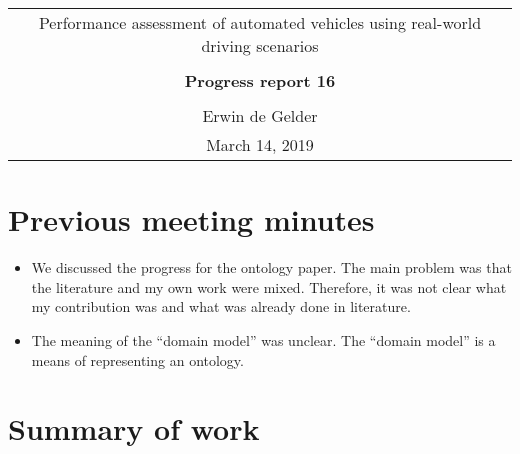 \documentclass[10pt,final,a4paper,oneside,onecolumn]{article}
\newcommand{\progressreportnumber}{16}
\renewcommand{\author}{Erwin de Gelder}
\renewcommand{\date}{March 14, 2019}
\renewcommand{\title}{Performance assessment of automated vehicles using real-world driving scenarios}
\begin{document}
	
\begin{center}
	\begin{tabular}{c}
		\title \\ \\
		\textbf{\huge Progress report \progressreportnumber} \\ \\
		\author \\ 
		\date
	\end{tabular}
\end{center}

\section{Previous meeting minutes}

\begin{itemize}
	\item We discussed the progress for the ontology paper. The main problem was that the literature and my own work were mixed. Therefore, it was not clear what my contribution was and what was already done in literature. 
	\item The meaning of the ``domain model'' was unclear. The ``domain model'' is a means of representing an ontology. 
\end{itemize}

\section{Summary of work}
\end{document}
